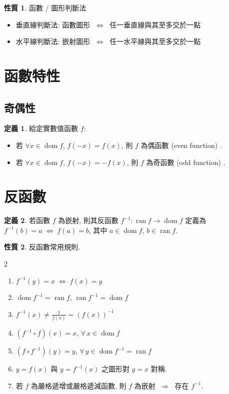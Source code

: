 \documentclass[12pt]{extarticle}
\newcommand{\ds}{\displaystyle}
\newcommand{\ie}{\;\Longrightarrow\;}
\newcommand{\ifff}{\;\Longleftrightarrow\;}
\DeclareMathOperator*{\dom}{dom}
\DeclareMathOperator*{\ran}{ran}
\theoremstyle{definition}
\newtheorem*{dfn}{定義}
\newtheorem*{prp}{性質}
\begin{document}
\begin{prp}函數 / 圖形判斷法
  \begin{itemize}\setlength\itemsep{0em}
    \item 垂直線判斷法: 函數圖形 $\ifff$ 任一垂直線與其至多交於一點
    \item 水平線判斷法: 嵌射圖形 $\ifff$ 任一水平線與其至多交於一點
  \end{itemize}
\end{prp}

\section*{函數特性}
\subsection*{奇偶性}
\begin{dfn} 給定實數值函數 $f$: 
  \begin{itemize}\setlength\itemsep{0em}
    \item 若 $\forall x\in\dom f$, $f(-x) = f(x)$, 則 $f$ 為偶函數 (even function) . 
    \item 若 $\forall x\in\dom f$, $f(-x) = -f(x)$, 則 $f$ 為奇函數 (odd function) . 
  \end{itemize}
\end{dfn}

\section*{反函數}

\begin{dfn}
  若函數 $f$ 為嵌射, 則其反函數 $f^{-1}:\ran f\to\dom f$ 定義為 $f^{-1}(b) = a \ifff f(a) = b$, 其中 $a\in\dom f$, $b\in\ran f$. 
\end{dfn}

\begin{prp} 反函數常用規則. 
  \setlength{\columnsep}{-0mm}
  \begin{multicols}{2}
    \begin{enumerate}\setlength\itemsep{0em}
      \item $f^{-1}(y) = x \ifff f(x) = y$
      \item $\dom f^{-1} = \ran f$, $\ran f^{-1} = \dom f$
      \item $\ds f^{-1}(x) \not= \frac{1}{f(x)} = (f(x))^{-1}$
      \item $(f^{-1}\circ f)(x) = x$, $\forall\,x\in\dom f$
      \item $(f\circ f^{-1})(y) = y$, $\forall\,y\in\dom f^{-1} = \ran f$
      \item $y = f(x)$ 與 $y = f^{-1}(x)$ 之圖形對 $y = x$ 對稱. 
      \item 若 $f$ 為嚴格遞增或嚴格遞減函數, 則 $f$ 為嵌射 $\ie$ 存在 $f^{-1}$. 
    \end{enumerate}
  \end{multicols}
\end{prp}
\end{document}
